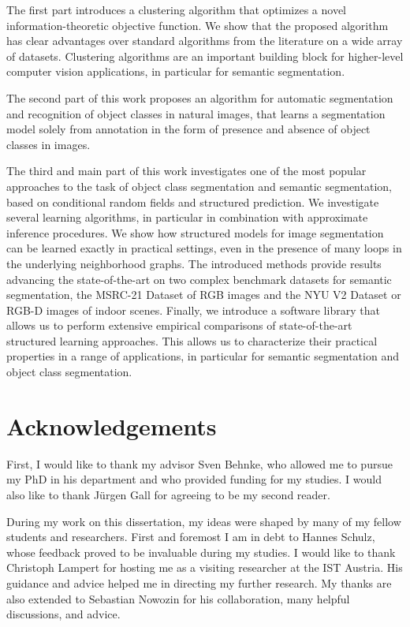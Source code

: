 \documentclass[12pt,toc=bibnumbered, a4paper,twoside,DIV=11,BCOR=1cm]{scrbook}
\begin{document}
The first part introduces a clustering algorithm that optimizes a novel
information-theoretic objective function. We show that the proposed algorithm
has clear advantages over standard algorithms from the literature on a wide
array of datasets. Clustering algorithms are an important building block for
higher-level computer vision applications, in particular for semantic
segmentation.

The second part of this work proposes an algorithm for automatic segmentation
and recognition of object classes in natural images, that learns a segmentation
model solely from annotation in the form of presence and absence of object classes
in images.

The third and main part of this work investigates one of the most popular
approaches to the task of object class segmentation and semantic segmentation,
based on conditional random fields and structured prediction.
%
We investigate several learning algorithms, in particular in combination with
approximate inference procedures. We show how structured models for image
segmentation can be learned exactly in practical settings, even in the presence
of many loops in the underlying neighborhood graphs.
The introduced methods provide results advancing the state-of-the-art on two
complex benchmark datasets for semantic segmentation, the MSRC-21 Dataset of RGB
images and the NYU V2 Dataset or RGB-D images of indoor scenes.
%
Finally, we introduce a software library that allows us to perform extensive empirical
comparisons of state-of-the-art structured learning approaches. This allows us
to characterize their practical properties in a range of applications, in
particular for semantic segmentation and object class segmentation.


\chapter*{Acknowledgements}
First, I would like to thank my advisor Sven Behnke, who allowed me
to pursue my PhD in his department and who provided funding for my studies.
I would also like to thank J\"urgen Gall for agreeing to be my second reader.

During my work on this dissertation, my ideas were shaped by many of my fellow
students and researchers. First and foremost I am in debt to Hannes Schulz,
whose feedback proved to be invaluable during my studies.
I would like to thank Christoph Lampert for hosting me as a visiting researcher
at the IST Austria. His guidance and advice helped me in directing my further
research. My thanks are also extended to Sebastian Nowozin for his collaboration,
many helpful discussions, and advice.
\end{document}

